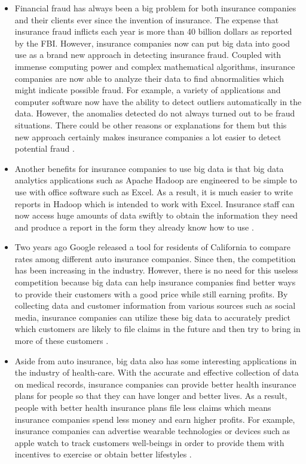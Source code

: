 \begin{itemize} 

    \item Financial fraud has always been a big problem for both insurance companies and their clients ever since the invention of insurance. The expense that insurance fraud inflicts each year is more than 40 billion dollars as reported by the FBI. However, insurance companies now can put big data into good use as a brand new approach in detecting insurance fraud. Coupled with immense computing power and complex mathematical algorithms, insurance companies are now able to analyze their data to find abnormalities which might indicate possible fraud. For example, a variety of applications and computer software now have the ability to detect outliers automatically in the data. However, the anomalies detected do not always turned out to be fraud situations. There could be other reasons or explanations for them but this new approach certainly makes insurance companies a lot easier to detect potential fraud \cite{Cordray2015data}.
    
    \item Another benefits for insurance companies to use big data is that big data analytics applications such as Apache Hadoop are engineered to be simple to use with office software such as Excel. As a result, it is much easier to write reports in Hadoop which is intended to work with Excel. Insurance staff can now access huge amounts of data swiftly to obtain the information they need and produce a report in the form they already know how to use \cite{Cordray2015data}.
    
    \item Two years ago Google released a tool for residents of California to compare rates among different auto insurance companies. Since then, the competition has been increasing in the industry. However, there is no need for this useless competition because big data can help insurance companies find better ways to provide their customers with a good price while still earning profits. By collecting data and customer information from various sources such as social media, insurance companies can utilize these big data to accurately predict which customers are likely to file claims in the future and then try to bring in more of these customers \cite{Cordray2015data}. 
    
    \item Aside from auto insurance, big data also has some interesting applications in the industry of health-care. With the accurate and effective collection of data on medical records, insurance companies can provide better health insurance plans for people so that they can have longer and better lives. As a result, people with better health insurance plans file less claims which means insurance companies spend less money and earn higher profits. For example, insurance companies can advertise wearable technologies or devices such as apple watch to track customers well-beings in order to provide them with incentives to exercise or obtain better lifestyles \cite{Cordray2015data}. 
    

\end{itemize}
